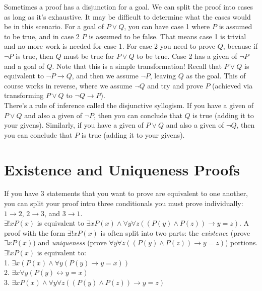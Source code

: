 \documentclass{article}
\begin{document}
\noindent Sometimes a proof has a disjunction for a goal. We can split the proof into cases as long as it's exhaustive. It may be difficult to determine what the cases would be in this scenario. For a goal of $P \lor Q$, you can have case 1 where $P$ is assumed to be true, and in case 2 $P$ is assumed to be false. That means case 1 is trivial and no more work is needed for case 1. For case 2 you need to prove $Q$, because if $\lnot P$ is true, then $Q$ must be true for $P \lor Q$ to be true. Case 2 has a given of $\lnot P$ and a goal of $Q$. Note that this is a simple transformation! Recall that $P \lor Q$ is equivalent to $\lnot P \rightarrow Q$, and then we assume $\lnot P$, leaving $Q$ as the goal. This of course works in reverse, where we assume $\lnot Q$ and try and prove $P$ (achieved via transforming $P \lor Q$ to $\lnot Q \rightarrow P$).\\

\noindent There's a rule of inference called the \gls{disjunctive syllogism}. If you have a given of $P \lor Q$ and also a given of $\lnot P$, then you can conclude that $Q$ is true (adding it to your givens). Similarly, if you have a given of $P \lor Q$ and also a given of $\lnot Q$, then you can conclude that $P$ is true (adding it to your givens).

\section{Existence and Uniqueness Proofs}
If you have 3 statements that you want to prove are equivalent to one another, you can split your proof intro three conditionals you must prove individually: $1 \rightarrow 2$, $2 \rightarrow 3$, and $3 \rightarrow 1$.\\

\noindent $\exists!xP(x)$ is equivalent to $\exists xP(x) \land \forall y \forall z((P(y) \land P(z)) \rightarrow y = z)$. A proof with the form $\exists!xP(x)$ is often split into two parts: the \textit{existence} (prove $\exists xP(x)$) and \textit{uniqueness} (prove $\forall y \forall z((P(y) \land P(z)) \rightarrow y = z)$) portions.\\

\noindent $\exists!xP(x)$ is equivalent to:\\
1. $\exists x(P(x) \land \forall y(P(y) \rightarrow y = x))$\\
2. $\exists x \forall y(P(y) \leftrightarrow y = x)$\\
3. $\exists xP(x) \land \forall y \forall z((P(y) \land P(z)) \rightarrow y = z)$


\clearpage
\printglossary[type=\acronymtype,style=long]  %
\printglossary[type=symbolslist,style=long]   %
\printglossary[type=main]                     %
\end{document}
